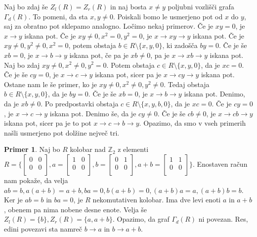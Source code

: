 \documentclass[a4paper, 12pt]{amsart}
\theoremstyle{definition} %
\newtheorem{primer}[definicija]{Primer}
\theoremstyle{plain} %
\newcommand{\Z}{\mathbb Z}
\begin{document}
Naj bo zdaj še $Z_l(R) = Z_r(R)$ in naj bosta $x\neq y$ poljubni vozlišči grafa $\Gamma_d(R)$. To pomeni, da sta $x,y\neq 0$. Poiskali bomo le usmerjeno pot od $x$ do $y$, saj za obratno pot sklepamo analogno. Ločimo nekaj primerov. Če je $xy=0$, je $x\rightarrow y$ iskana pot. Če je $xy \neq 0, x^2 = 0, y^2 =0$, je $x\rightarrow xy \rightarrow y$ iskana pot. Če je $xy\neq 0, y^2 \neq 0, x^2 = 0$, potem obstaja $b\in R\setminus\{x,y,0\}$, ki zadošča $by = 0$. Če je še $xb =0$, je $x\rightarrow b \rightarrow y$ iskana pot, če pa je $xb \neq 0$, pa je $x\rightarrow xb  \rightarrow y$ iskana pot. Naj bo zdaj $xy\neq0, x^2\neq 0, y^2 =0$. Potem obstaja $c\in R\setminus \{x,y,0\}$, da je $xc = 0$. Če je še $cy = 0$, je $x\rightarrow c \rightarrow y$ iskana pot, sicer pa je $x \rightarrow cy \rightarrow y$ iskana pot. Ostane nam le še primer, ko je $xy\neq 0, x^2 \neq 0, y^2 \neq 0$. Tedaj obstaja $b\in R\setminus \{x,y,0\}$, da je $by=0$. Če je še $xb=0$, je $x\rightarrow b \rightarrow y$ iskana pot. Denimo, da je $xb\neq 0$. Po predpostavki obstaja $c\in R\setminus \{x,y,b,0\}$, da je $xc=0$. Če je $cy = 0$, je $x\rightarrow c \rightarrow y$ iskana pot. Denimo še, da je  $cy\neq 0$. Če je še $cb \neq 0$, je $x\rightarrow cb \rightarrow y$ iskana pot, sicer pa je to pot $x\rightarrow c \rightarrow b \rightarrow y$.
Opazimo, da smo v vseh primerih našli usmerjeno pot dolžine nejveč tri.
\endproof

\begin{primer}
Naj bo $R$ kolobar nad $\Z_2$ z elementi $R=\big\{
\begin{bmatrix}
0 & 0\\
0 & 0\\
\end{bmatrix},
a=
\begin{bmatrix}
1 & 0\\
0 & 0\\
\end{bmatrix},
b = 
\begin{bmatrix}
0 & 1\\
0 & 0\\
\end{bmatrix},
a+b=
\begin{bmatrix}
1 & 1\\
0 & 0\\
\end{bmatrix}
\big\}
$.
Enostaven račun nam pokaže, da velja $ab=b, a(a+b) = a+b, ba = 0,b(a+b)  = 0, (a+b)a=a,(a+b)b=b$. Ker je $ab=b$ in $ba=0$, je $R$ nekomutativen kolobar. Ima dve levi enoti $a$ in $a+b$, obenem pa  nima nobene desne enote. Velja še $Z_l(R) = \{b\}, Z_r(R) = \{a,a+b\}$. Opazimo, da graf $\Gamma_d(R)$ ni povezan. Res, edini povezavi sta namreč $b\rightarrow a$ in $b\rightarrow a+b$.
\end{primer}
\end{document}
